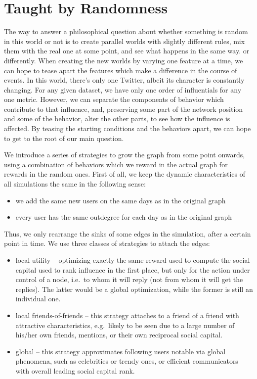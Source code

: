 \documentclass[10pt,oneside]{memoir}
\begin{document}
\section{Taught by Randomness}
\label{taughtbyrandomness}

The way to answer a philosophical question about whether something is random in this world or not is to create parallel worlds with slightly different rules, mix them with the real one at some point, and see what happens in the same way. or differently.  When creating the new worlds by varying one feature at a time, we can hope to tease apart the features which make a difference in the course of events.  In this world, there's only one Twitter, albeit its character is constantly changing.  For any given dataset, we have only one order of influentials for any one metric.  However, we can separate the components of behavior which contribute to that influence, and, preserving some part of the network position and some of the behavior, alter the other parts, to see how the influence is affected.  By teasing the starting conditions and the behaviors apart, we can hope to get to the root of our main question.


We introduce a series of strategies to grow the graph from some point onwards, using a combination of behaviors which we reward in the actual graph for rewards in the random ones.  First of all, we keep the dynamic characteristics of all simulations the same in the following sense:


\begin{itemize}


\item we add the same new users on the same days as in the original graph

\item every user has the same outdegree for each day as in the original graph
\end{itemize}

Thus, we only rearrange the sinks of some edges in the simulation, after a certain point in time.  We use three classes of strategies to attach the edges:


\begin{itemize}


\item local utility -- optimizing exactly the same reward used to compute the social capital used to rank influence in the first place, but only for the action under control of a node, i.e.\ to whom it will reply (not from whom it will get the replies).  The latter would be a global optimization, while the former is still an individual one.

\item local friends-of-friends -- this strategy attaches to a friend of a friend with attractive characteristics, e.g.\ likely to be seen due to a large number of his/her own friends, mentions, or their own reciprocal social capital.

\item global -- this strategy approximates following users notable via global phenomena, such as celebrities or trendy ones, or efficient communicators with overall leading social capital rank.
\end{itemize}
\end{document}
